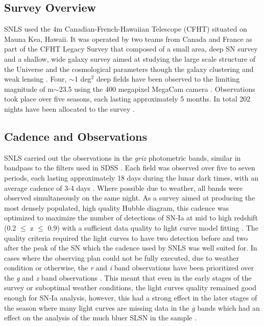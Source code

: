 \subsection{Survey Overview}
SNLS used the 4m Canadian-French-Hawaiian Telescope (CFHT) situated on Mauna Kea, Hawaii. It was operated by two teams from Canada and France as part of the CFHT Legacy Survey that composed of a small area, deep SN survey and a shallow, wide galaxy survey aimed at studying the large scale structure of the Universe and the cosmological parameters though the galaxy clustering and weak lensing \citep{Pritchet2004,Astier2006}. Four, $\sim$1 deg$^2$ deep fields have been observed to the limiting magnitude of m$\sim$23.5 using the 400 megapixel MegaCam camera \citep{Boulade2003}. Observations took place over five seasons, each lasting approximately 5 months. In total 202 nights have been allocated to the survey \citep{Pritchet2004}.

\subsection{Cadence and Observations}
SNLS carried out the observations in the \textit{griz} photometric bands, similar in bandpass to the filters used in SDSS . Each field was observed over five to seven periods, each lasting approximately 18 days during the lunar dark times, with an average cadence of 3-4 days \citep{Astier2006,Guy2010}. Where possible due to weather, all bands were observed simultaneously on the same night. As a survey aimed at producing the most densely populated, high quality Hubble diagram, this cadence was optimized to maximize the number of detections of SN-Ia at mid to high redshift (0.2 $\leq$ z $\leq$ 0.9) with a sufficient data quality to light curve model fitting \citep{Pritchet2004}. The quality criteria required the light curves to have two detection before and two after the peak of the SN which the cadence used by SNLS was well suited for. In cases where the observing plan could not be fully executed, due to weather condition or otherwise, the \textit{r} and \textit{i} band observations have been prioritized over the \textit{g} and \textit{z} band observations \citep{Guy2010}. This meant that even in the early stages of the survey or suboptimal weather conditions, the light curves quality remained good enough for SN-Ia analysis, however, this had a strong effect in the later stages of the season where many light curves are missing data in the \textit{g} bands which had an effect on the analysis of the much bluer SLSN in the sample \citep{Prajs2016}.

